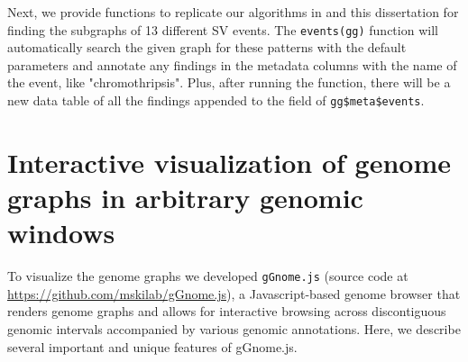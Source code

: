 \documentclass[phd,tocprelim]{cornell}
\renewcommand{\caption}[1]{\singlespacing\hangcaption{#1}\normalspacing}
\begin{document}
Next, we provide functions to replicate our algorithms in \cite{Hadi2020-um} and this dissertation for finding the subgraphs of 13 different SV events. The \texttt{events(gg)} function will automatically search the given graph for these patterns with the default parameters and annotate any findings in the metadata columns with the name of the event, like "chromothripsis". Plus, after running the function, there will be a new data table of all the findings appended to the field of \texttt{gg\$meta\$events}.

\section{Interactive visualization of genome graphs in arbitrary genomic windows}
To visualize the genome graphs we developed \texttt{gGnome.js} (source code at \url{https://github.com/mskilab/gGnome.js}), a Javascript-based genome browser that renders genome graphs and allows for interactive browsing across discontiguous genomic intervals accompanied by various genomic annotations. Here, we describe several important and unique features of gGnome.js.

\clearpage



\begin{figure}[ht]
\end{figure}
\end{document}
